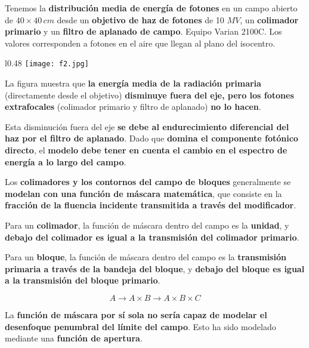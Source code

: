 \documentclass[aspectratio=169,xcolor=dvipsnames,t]{beamer}
\newcommand{\be}{\begin{equation*}}
\newcommand{\ee}{\end{equation*}}
\begin{document}
\begin{frame}

    Tenemos la \textbf{distribución media de energía de fotones} en un campo abierto de $40 \times 40 \, cm$  desde un \textbf{objetivo de haz de fotones} de 10 $MV$, un \textbf{colimador primario} y un \textbf{filtro de aplanado de campo}. Equipo  Varian 2100C. Los valores corresponden a fotones en el aire que llegan al plano del isocentro.

    \begin{wrapfigure}{l}{0.48\textwidth}
        \centering
        \texttt{[image: f2.jpg]}
    \end{wrapfigure}

    La figura muestra que \textbf{la energía media de la radiación primaria} (directamente desde el objetivo) \textbf{disminuye fuera del eje, pero los fotones extrafocales} (colimador primario y filtro de aplanado) \textbf{no lo hacen}. 

    Esta disminución fuera del eje \textbf{se debe al endurecimiento diferencial del haz por el filtro de aplanado}. Dado que \textbf{domina el componente fotónico directo}, el \textbf{modelo debe tener en cuenta el cambio en el espectro de energía a lo largo del campo}.
    
\end{frame}

\begin{frame}

    Los \textbf{colimadores y los contornos del campo de bloques} generalmente se \textbf{modelan con una función de máscara matemática}, que consiste en la \textbf{fracción de la fluencia incidente transmitida a través del modificador}. 

    Para un \textbf{colimador}, la función de máscara dentro del campo es la \textbf{unidad}, y \textbf{debajo del colimador es igual a la transmisión del colimador primario}. 
    
    Para un \textbf{bloque}, la función de máscara dentro del campo es la \textbf{transmisión primaria a través de la bandeja del bloque}, y \textbf{debajo del bloque es igual a la transmisión del bloque primario}.

    \be
    A \rightarrow A \times B \rightarrow A \times B \times C
    \ee

    La \textbf{función de máscara por sí sola no sería capaz de modelar el desenfoque penumbral del límite del campo}. Esto ha sido modelado mediante una \textbf{función de apertura}. 

\end{frame}
\end{document}
